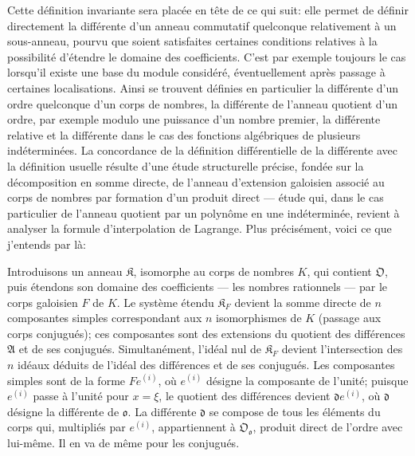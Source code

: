 Cette définition invariante sera placée en tête de ce qui suit: elle permet de définir directement la différente d'un anneau commutatif quelconque relativement à un sous-anneau, pourvu que soient satisfaites certaines conditions relatives à la possibilité d'étendre le domaine des coefficients. C'est par exemple toujours le cas lorsqu'il existe une base du module considéré, éventuellement après passage à certaines localisations. Ainsi se trouvent définies en particulier la différente d'un ordre quelconque d'un corps de nombres, la différente de l'anneau quotient d'un ordre, par exemple modulo une puissance d'un nombre premier, la différente relative et la différente dans le cas des fonctions algébriques de plusieurs indéterminées. La concordance de la définition différentielle de la différente avec la définition usuelle résulte d'une étude structurelle précise, fondée sur la décomposition en somme directe, de l'anneau d'extension galoisien associé au corps de nombres par formation d'un produit direct --- étude qui, dans le cas particulier de l'anneau quotient par un polynôme en une indéterminée, revient à analyser la formule d'interpolation de Lagrange. Plus précisément, voici ce que j'entends par là:

Introduisons un anneau \(\mathfrak K\), isomorphe au corps de nombres \(K\), qui contient \(\mathfrak O\), puis étendons son domaine des coefficients --- les nombres rationnels --- par le corps galoisien \(F\) de \(K\). Le système étendu \(\mathfrak K_F\) devient la somme directe de \(n\) composantes simples correspondant aux \(n\) isomorphismes de \(K\) (passage aux corps conjugués); ces composantes sont des extensions du quotient des différences \(\mathfrak A\) et de ses conjugués. Simultanément, l'idéal nul de \(\mathfrak K_F\) devient l'intersection des \(n\) idéaux déduits de l'idéal des différences et de ses conjugués. Les composantes simples sont de la forme \(Fe^{(i)}\), où \(e^{(i)}\) désigne la composante de l'unité; puisque \(e^{(i)}\) passe à l'unité pour \(x=\xi\), le quotient des différences devient \(\mathfrak d e^{(i)}\), où \(\mathfrak d\) désigne la différente de \(\mathfrak o\). La différente \(\mathfrak d\) se compose de tous les éléments du corps qui, multipliés par \(e^{(i)}\), appartiennent à \(\mathfrak O_{\mathfrak o}\), produit direct de l'ordre avec lui-même. Il en va de même pour les conjugués.

